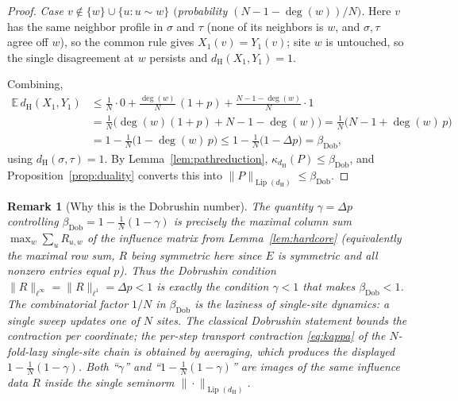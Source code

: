 \documentclass{amsart}
\newtheorem{remark}{Remark}
\DeclareMathOperator{\Lip}{Lip}
\newcommand{\E}{\mathbb{E}}
\begin{document}
\begin{proof}
\smallskip
\noindent\emph{Case $v\notin\{w\}\cup\{u:u\sim w\}$ $($probability
$(N-1-\deg(w))/N)$.} Here $v$ has the same neighbor profile in $\sigma$ and
$\tau$ (none of its neighbors is $w$, and $\sigma,\tau$ agree off $w$), so the
common rule gives $X_1(v)=Y_1(v)$; site $w$ is untouched, so the single
disagreement at $w$ persists and $d_{\mathrm H}(X_1,Y_1)=1$.

\smallskip
Combining,
\begin{align*}
\E\,d_{\mathrm H}(X_1,Y_1)
&\le \frac1N\cdot 0
+\frac{\deg(w)}{N}\,(1+p)
+\frac{N-1-\deg(w)}{N}\cdot 1\\
&=\frac{1}{N}\Big(\deg(w)(1+p)+N-1-\deg(w)\Big)
=\frac{1}{N}\Big(N-1+\deg(w)\,p\Big)\\
&=1-\frac1N\big(1-\deg(w)\,p\big)
\le 1-\frac1N\big(1-\Delta p\big)=\beta_{\mathrm{Dob}} ,
\end{align*}
using $d_{\mathrm H}(\sigma,\tau)=1$. By Lemma~\ref{lem:pathreduction},
$\kappa_{d_{\mathrm H}}(P)\le\beta_{\mathrm{Dob}}$, and
Proposition~\ref{prop:duality} converts this into
$\|P\|_{\Lip(d_{\mathrm H})}\le\beta_{\mathrm{Dob}}$.
\end{proof}

\begin{remark}[Why this is the Dobrushin number]\label{rem:dobrushin}
The quantity $\gamma=\Delta p$ controlling
$\beta_{\mathrm{Dob}}=1-\tfrac1N(1-\gamma)$ is precisely the maximal column sum
$\max_w\sum_u R_{u,w}$ of the influence matrix from Lemma~\ref{lem:hardcore}
(equivalently the maximal row sum, $R$ being symmetric here since $E$ is
symmetric and all nonzero entries equal $p$). Thus the Dobrushin condition
$\|R\|_{\ell^\infty}=\|R\|_{\ell^1}=\Delta p<1$ is exactly the condition
$\gamma<1$ that makes $\beta_{\mathrm{Dob}}<1$. The combinatorial factor $1/N$
in $\beta_{\mathrm{Dob}}$ is the laziness of single-site dynamics: a single
sweep updates one of $N$ sites. The classical Dobrushin statement bounds the
contraction \emph{per coordinate}; the per-step transport contraction
\eqref{eq:kappa} of the $N$-fold-lazy single-site chain is obtained by averaging,
which produces the displayed $1-\tfrac1N(1-\gamma)$. Both ``$\gamma$'' and
``$1-\tfrac1N(1-\gamma)$'' are images of the same influence data $R$ inside the
single seminorm $\|\cdot\|_{\Lip(d_{\mathrm H})}$.
\end{remark}
\end{document}
